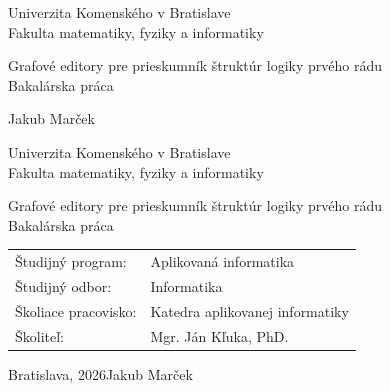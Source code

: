 \documentclass[12pt, twoside]{book}
\def\mfrok{2026}
\def\mfnazov{Grafové editory pre prieskumník štruktúr logiky prvého rádu}
\def\mftyp{Bakalárska práca}
\def\mfautor{Jakub Marček}
\def\mfskolitel{Mgr. Ján Kľuka, PhD. }
\def\mfmiesto{Bratislava, \mfrok}
\def\mfodbor{ Informatika }
\def\program{ Aplikovaná informatika }
\def\mfpracovisko{ Katedra aplikovanej informatiky }
\begin{document}
\frontmatter
\pagestyle{empty}


\begin{center}
    \sc\large
    Univerzita Komenského v Bratislave\\
    Fakulta matematiky, fyziky a informatiky

    \vfill

    {\LARGE\mfnazov}\\
    \mftyp
\end{center}

\vfill

{\sc\large
    \noindent \mfrok\hfill \mfautor
}

\cleardoublepage



\noindent

\begin{center}
    \sc
    \large
    Univerzita Komenského v Bratislave\\
    Fakulta matematiky, fyziky a informatiky

    \vfill

    {\LARGE\mfnazov}\\
    \mftyp
\end{center}

\vfill

\noindent
\begin{tabular}{ll}
    Študijný program:    & \program      \\
    Študijný odbor:      & \mfodbor      \\
    Školiace pracovisko: & \mfpracovisko \\
    Školiteľ:            & \mfskolitel   \\
\end{tabular}

\vfill


\noindent \mfmiesto\hfill \mfautor

\cleardoublepage



\newpage
\setcounter{page}{3}

\end{document}
